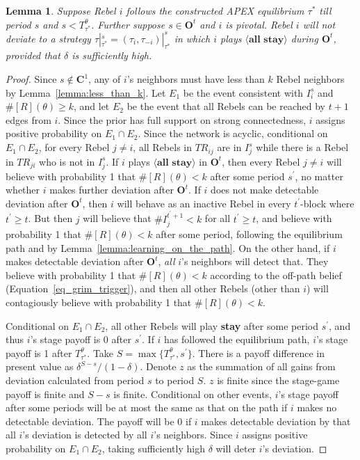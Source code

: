 \documentclass[12pt,letter]{article}
\newcommand{\Kappa}{\mathbf{C}}
\newcommand{\Omicron}{\mathbf{O}}
\newtheorem{lemma}{Lemma}[section]
\theoremstyle{definition}
\theoremstyle{remark}
\theoremstyle{claim}
\begin{document}
\begin{lemma}\label{lemma:p_mimic_in} Suppose Rebel $i$ follows the constructed APEX equilibrium $\tau^{*}$ till period $s$ and $s<T^{\theta}_{\tau^{*}}$. Further suppose $s\in \Omicron^t$ and $i$ is pivotal. Rebel $i$ will not deviate to a strategy $\tau|^s_{\tau^{*}}=(\tau_i,\tau_{-i})|^s_{\tau^{*}}$ in which $i$ plays $\langle \textbf{all stay} \rangle$ during $\Omicron^t$, provided that $\delta$ is sufficiently high.
\end{lemma}
\begin{proof}

Since $s\not\in \Kappa^1$, any of $i$'s neighbors must have less than $k$ Rebel neighbors by Lemma~\ref{lemma:less_than_k}. Let $E_1$ be the event consistent with $I^s_i$ and $\#[R](\theta)\geq k$, and let $E_2$ be the event that all Rebels can be reached by $t+1$ edges from $i$. Since the prior has full support on strong connectedness, $i$ assigns positive probability on $E_1\cap E_2$. Since the network is acyclic, conditional on $E_1\cap E_2$, for every Rebel $j\neq i$, all Rebels in $TR_{ij}$ are in $I^s_j$ while there is a Rebel in $TR_{ji}$ who is not in $I^s_j$. If $i$ plays $\langle \textbf{all stay} \rangle$ in $\Omicron^t$, then every Rebel $j\neq i$ will believe with probability 1 that $\#[R](\theta)<k$ after some period $s^{'}$, no matter whether $i$ makes further deviation after $\Omicron^t$. If $i$ does not make detectable deviation after $\Omicron^t$, then $i$ will behave as an inactive Rebel in every $t^{'}$-block where $t^{'}\geq t$. But then $j$ will believe that $\#I^{t^{'}+1}_j<k$ for all $t^{'}\geq t$, and believe with probability 1 that $\#[R](\theta)<k$ after some period, following the equilibrium path and by Lemma~\ref{lemma:learning_on_the_path}. On the other hand, if $i$ makes detectable deviation after $\Omicron^t$, \textit{all} $i$'s neighbors will detect that. They believe with probability 1 that $\#[R](\theta)<k$ according to the off-path belief (Equation~\ref{eq_grim_trigger}), and then all other Rebels (other than $i$) will contagiously believe with probability 1 that $\#[R](\theta)<k$.

Conditional on $E_1\cap E_2$, all other Rebels will play \textbf{stay} after some period $s^{'}$, and thus $i$'s stage payoff is 0 after $s^{'}$. If $i$ has followed the equilibrium path, $i$'s stage payoff is 1 after $T^{\theta}_{\tau^{*}}$. Take $S=\max\{T^{\theta}_{\tau^{*}},s^{'}\}$. There is a payoff difference in present value as $\delta^{S-s}/(1-\delta)$. Denote $z$ as the summation of all gains from deviation calculated from period $s$ to period $S$. $z$ is finite since the stage-game payoff is finite and $S-s$ is finite. Conditional on other events, $i$'s stage payoff after some periods will be at most the same as that on the path if $i$ makes no detectable deviation. The payoff will be 0 if $i$ makes detectable deviation by that all $i$'s deviation is detected by all $i$'s neighbors. Since $i$ assigns positive probability on $E_1\cap E_2$, taking sufficiently high $\delta$ will deter $i$'s deviation.

\end{proof}
\end{document}
